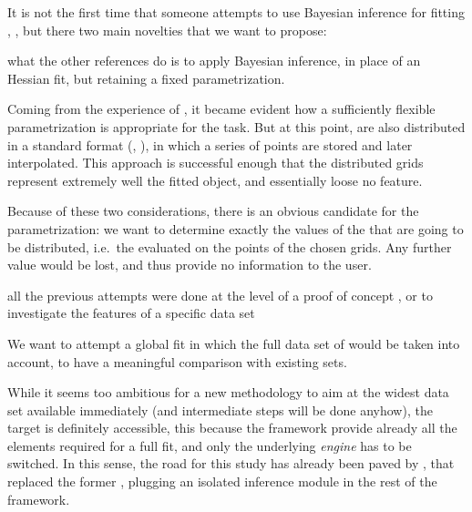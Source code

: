 It is not the first time that someone attempts to use Bayesian inference for
fitting \pdfs, \cite{Gbedo:2017eyp,Aggarwal:2022cki}, but there two main
novelties that we want to propose:
\begin{description}[font=\normalfont\sffamily\scshape,leftmargin=2cm,style=nextline]
  \item[parametrization] what the other references do is to apply Bayesian
    inference, in place of an Hessian fit, but retaining a fixed
    parametrization.

    Coming from the experience of \nnpdf, it became evident how a sufficiently
    flexible parametrization is appropriate for the task.
    But at this point, \pdfs are also distributed in a standard format
    (\lhapdf, \cite{Buckley:2014ana}), in which a series of points are stored
    and later interpolated.
    This approach is successful enough that the distributed grids represent
    extremely well the fitted object, and essentially loose no feature.

    Because of these two considerations, there is an obvious candidate for the
    parametrization: we want to determine exactly the values of the \pdfs that
    are going to be distributed, i.e.\ the \pdfs evaluated on the points of the
    chosen grids.
    Any further value would be lost, and thus provide no information to the
    user.
  \item[data set] all the previous attempts were done at the level of a proof
    of concept \cite{Gbedo:2017eyp}, or to investigate the features of a
    specific data set \cite{Aggarwal:2022cki}

    We want to attempt a global fit in which the full data set of \nnpdf would
    be taken into account, to have a meaningful comparison with existing \pdf
    sets.
    
    While it seems too ambitious for a new methodology to aim at the widest
    data set available immediately (and intermediate steps will be done
    anyhow), the target is definitely accessible, this because the \nnpdf
    framework provide already all the elements required for a full fit, and
    only the underlying \textit{engine} has to be switched.
    In this sense, the road for this study has already been paved by \nnnfit
    \cite{Carrazza:2019mzf}, that replaced the former \nnpdf \nn, plugging an
    isolated inference module in the rest of the framework.
\end{description}

